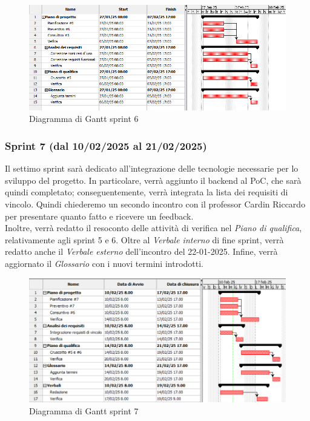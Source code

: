 \begin{figure}[h!]
    \centering
    \includegraphics[scale = 0.6]{template/images/gantt6.png}
    \caption{Diagramma di Gantt sprint 6}
    \label{fig:3.6} %
\end{figure}

\subsubsection{Sprint 7 (dal 10/02/2025 al 21/02/2025)}
Il settimo sprint sarà dedicato all'integrazione delle tecnologie necessarie
per lo sviluppo del progetto. In particolare, verrà aggiunto il backend al PoC,
che sarà quindi completato; conseguentemente, verrà integrata la lista dei
requisiti di vincolo. Quindi chiederemo un secondo incontro con il professor
Cardin Riccardo per presentare quanto fatto e ricevere un feedback.\\ Inoltre,
verrà redatto il resoconto delle attività di verifica nel \textit{Piano di
qualifica}, relativamente agli sprint 5 e 6. Oltre al \textit{Verbale interno} 
di fine sprint, verrà redatto anche il \textit{Verbale esterno} dell'incontro
del 22-01-2025. Infine, verrà aggiornato il \textit{Glossario} con i nuovi termini introdotti.
\begin{figure}[h!]
    \centering
    \includegraphics[scale = 0.65]{template/images/gantt7.png}
    \caption{Diagramma di Gantt sprint 7}
    \label{fig:3.7} %
\end{figure}
\newpage

